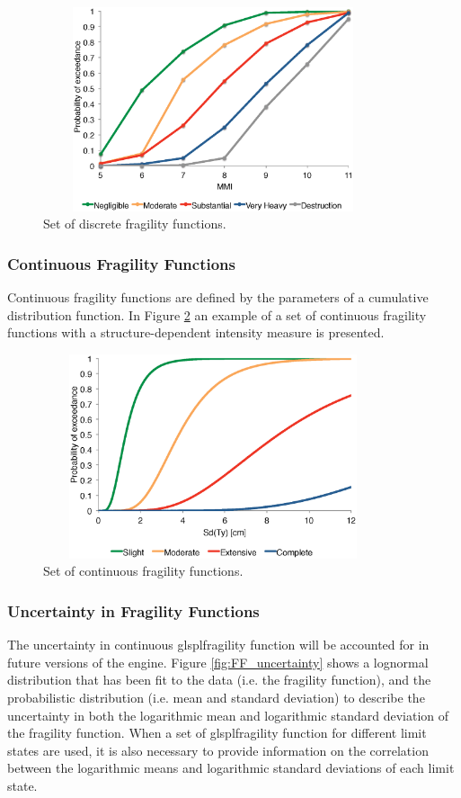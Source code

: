 \begin{figure}[ht]
\centering
\includegraphics[width=10cm,height=6cm]{./figures/risk/FFDiscrete.eps}
\caption{Set of discrete fragility functions.}
\label{fig:FFDiscrete}
\end{figure}

\subsubsection{Continuous Fragility Functions}
Continuous \glspl{fragility function} are defined by the parameters of a cumulative distribution function. In Figure \ref{fig:FFcontinuous} an example of a set of continuous fragility functions with a structure-dependent intensity measure is presented. 

\begin{figure}[ht]
\centering
\includegraphics[width=10cm,height=6cm]{./figures/risk/FFContinuous.eps}
\caption{Set of continuous fragility functions.}
\label{fig:FFcontinuous}
\end{figure}

\color{blue}
\subsubsection{Uncertainty in Fragility Functions}
The uncertainty in continuous glspl{fragility function} will be accounted for in future versions of the engine. Figure \ref{fig:FF_uncertainty} shows a lognormal distribution that has been fit to the data (i.e. the fragility function), and the probabilistic distribution (i.e. mean and standard deviation) to describe the uncertainty in both the logarithmic mean and logarithmic standard deviation of the fragility function. When a set of glspl{fragility function} for different limit states are used, it is also necessary to provide information on the correlation between the logarithmic means and logarithmic standard deviations of each limit state.

